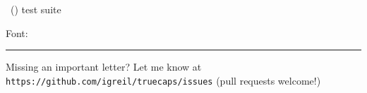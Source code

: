 \documentclass{article}
\begin{document}
\begin{flushright}
	\Large\textbf{\truecapsname} \truecapsversion ~(\truecapsdate) test suite\par
	\ifluatex
	\large Font: 
	\fi
\end{flushright}


	\def\presection		{\vspace{-1em}}
	\def\postsection	{\vspace{-.5em}\hrule\vspace{.5em}}


%
%
%
%
%

















 









%

%




\vspace{1em}\hrule\vspace{3em}
\noindent Missing an important letter? Let me know at 	
\texttt{https://github.com/igreil/truecaps/issues} (pull requests welcome!)
\end{document}
